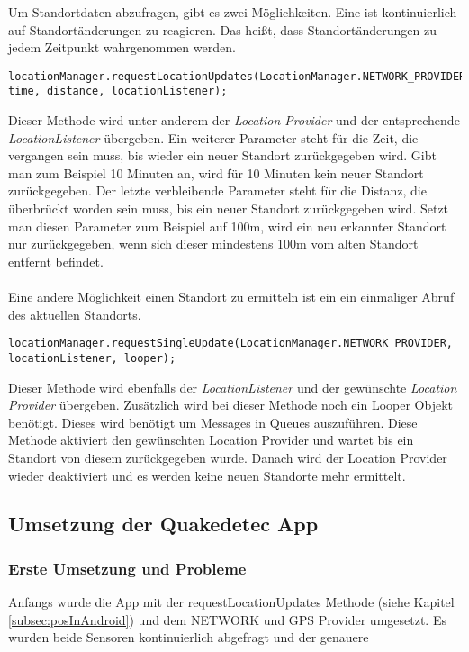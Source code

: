 Um Standortdaten abzufragen, gibt es zwei Möglichkeiten. 
Eine ist kontinuierlich auf Standortänderungen zu reagieren. Das heißt, dass Standortänderungen zu jedem Zeitpunkt wahrgenommen werden.

\begin{lstlisting}[caption={requestLocationUpdates},label=lst:requestLocationUpdates, basicstyle=\small]
locationManager.requestLocationUpdates(LocationManager.NETWORK_PROVIDER, time, distance, locationListener);
\end{lstlisting}

Dieser Methode wird unter anderem der \textit{Location Provider} und der entsprechende \textit{LocationListener} übergeben. Ein weiterer Parameter steht für die Zeit, die vergangen sein muss, bis wieder ein neuer Standort zurückgegeben wird. Gibt man zum Beispiel 10 Minuten an, wird für 10 Minuten kein neuer Standort zurückgegeben. 
Der letzte verbleibende Parameter steht für die Distanz, die überbrückt worden sein muss, bis ein neuer Standort zurückgegeben wird. Setzt man diesen Parameter zum Beispiel auf 100m, wird ein neu erkannter Standort nur zurückgegeben, wenn sich dieser mindestens 100m vom alten Standort entfernt befindet. 
\\
\\
Eine andere Möglichkeit einen Standort zu ermitteln ist ein ein einmaliger Abruf des aktuellen Standorts.
\begin{lstlisting}[caption={requestSingleUpdate},label=lst:requestSingleUpdate, basicstyle=\small]
locationManager.requestSingleUpdate(LocationManager.NETWORK_PROVIDER, locationListener, looper);
\end{lstlisting}


Dieser Methode wird ebenfalls der \textit{LocationListener} und der gewünschte \textit{Location Provider} übergeben. Zusätzlich wird bei dieser Methode noch ein Looper Objekt benötigt. Dieses wird benötigt um Messages in Queues auszuführen. 
Diese Methode aktiviert den gewünschten Location Provider und wartet bis ein Standort von diesem zurückgegeben wurde. Danach wird der Location Provider wieder deaktiviert und es werden keine neuen Standorte mehr ermittelt.

\subsection{Umsetzung der Quakedetec App}
\subsubsection{Erste Umsetzung und Probleme}
Anfangs wurde die App mit der requestLocationUpdates Methode (siehe Kapitel \ref{subsec:posInAndroid}) und dem NETWORK und GPS Provider umgesetzt. Es wurden beide Sensoren kontinuierlich abgefragt und der genauere

